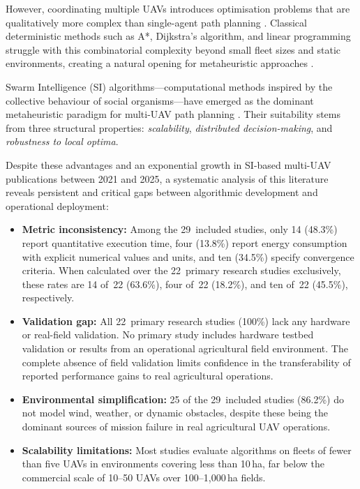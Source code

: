 \documentclass[review,3p]{elsarticle}
\begin{document}
However, coordinating multiple UAVs introduces optimisation problems that are
qualitatively more complex than single-agent path planning
\cite{chung2018,gupta2016,bekmezci2013,hayat2016}. Classical deterministic
methods such as A*, Dijkstra's algorithm, and linear programming struggle with
this combinatorial complexity beyond small fleet sizes and static environments,
creating a natural opening for metaheuristic approaches \cite{aitsaadi2022}.

Swarm Intelligence (SI) algorithms---computational methods inspired by the
collective behaviour of social organisms---have emerged as the dominant
metaheuristic paradigm for multi-UAV path planning
\cite{dorigo2006,kennedy1995,blum2008,yang2010,beni2005,bonabeau1999,yang2013}.
Their suitability stems from three structural properties: \textit{scalability},
\textit{distributed decision-making}, and \textit{robustness to local optima}.

Despite these advantages and an exponential growth in SI-based multi-UAV
publications between 2021 and 2025, a systematic analysis of this literature
reveals persistent and critical gaps between algorithmic development and
operational deployment:

\begin{itemize}
  \item \textbf{Metric inconsistency:} Among the 29~included studies,
  only 14 (48.3\%) report quantitative execution time, four (13.8\%) report
  energy consumption with explicit numerical values and units, and ten (34.5\%)
  specify convergence criteria. When calculated over the 22~primary research
  studies exclusively, these rates are 14 of~22 (63.6\%), four of~22 (18.2\%),
  and ten of~22 (45.5\%), respectively.

  \item \textbf{Validation gap:} All 22~primary research studies (100\%)
  lack any hardware or real-field validation. No primary study includes hardware
  testbed validation or results from an operational agricultural field
  environment. The complete absence of field validation limits confidence in
  the transferability of reported performance gains to real agricultural
  operations.

  \item \textbf{Environmental simplification:} 25 of the 29~included studies
  (86.2\%) do not model wind, weather, or dynamic obstacles, despite these being
  the dominant sources of mission failure in real agricultural UAV operations.

  \item \textbf{Scalability limitations:} Most studies evaluate algorithms on
  fleets of fewer than five UAVs in environments covering less than 10\,ha,
  far below the commercial scale of 10--50 UAVs over 100--1,000\,ha fields.
\end{itemize}
\end{document}
